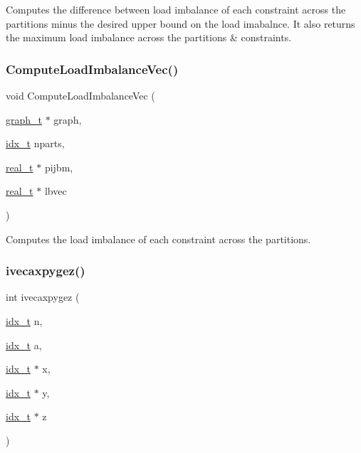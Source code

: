 Computes the difference between load imbalance of each constraint across the partitions minus the desired upper bound on the load imabalnce. It also returns the maximum load imbalance across the partitions \& constraints. \mbox{\label{a00230_a33a2df75ee1df15a8853bef52fd47559}} 
\subsubsection{\texorpdfstring{Compute\+Load\+Imbalance\+Vec()}{ComputeLoadImbalanceVec()}}
{\footnotesize\ttfamily void Compute\+Load\+Imbalance\+Vec (\begin{DoxyParamCaption}\item[{\hyperlink{a00734}{graph\+\_\+t} $\ast$}]{graph,  }\item[{\hyperlink{a00876_aaa5262be3e700770163401acb0150f52}{idx\+\_\+t}}]{nparts,  }\item[{\hyperlink{a00876_a1924a4f6907cc3833213aba1f07fcbe9}{real\+\_\+t} $\ast$}]{pijbm,  }\item[{\hyperlink{a00876_a1924a4f6907cc3833213aba1f07fcbe9}{real\+\_\+t} $\ast$}]{lbvec }\end{DoxyParamCaption})}

Computes the load imbalance of each constraint across the partitions. \mbox{\label{a00230_ab0dcd93bca76dcc3a266907b38b36ed7}} 
\subsubsection{\texorpdfstring{ivecaxpygez()}{ivecaxpygez()}}
{\footnotesize\ttfamily int ivecaxpygez (\begin{DoxyParamCaption}\item[{\hyperlink{a00876_aaa5262be3e700770163401acb0150f52}{idx\+\_\+t}}]{n,  }\item[{\hyperlink{a00876_aaa5262be3e700770163401acb0150f52}{idx\+\_\+t}}]{a,  }\item[{\hyperlink{a00876_aaa5262be3e700770163401acb0150f52}{idx\+\_\+t} $\ast$}]{x,  }\item[{\hyperlink{a00876_aaa5262be3e700770163401acb0150f52}{idx\+\_\+t} $\ast$}]{y,  }\item[{\hyperlink{a00876_aaa5262be3e700770163401acb0150f52}{idx\+\_\+t} $\ast$}]{z }\end{DoxyParamCaption})}

